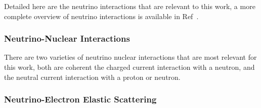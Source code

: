 Detailed here are the neutrino interactions that are relevant to this work, a more
complete overview of neutrino interactions is available in Ref~\cite{XXX}.
\subsubsection{Neutrino-Nuclear Interactions}
There are two varieties of neutrino nuclear interactions that are most
relevant for this work,
both are coherent
the charged current interaction with a neutron, and the
neutral current interaction with a proton or neutron.
\begin{figure}
        \centering
        \begin{feynman}
        \end{feynman}
\end{figure}
\subsubsection{Neutrino-Electron Elastic Scattering}
\begin{figure}
    \begin{subfigure}[t]{0.53\textwidth}
        \centering
        \begin{feynman}
        \end{feynman}
    \end{subfigure}
    \begin{subfigure}[t]{0.53\textwidth}
        \centering
        \begin{feynman}
        \end{feynman}
    \end{subfigure}
    \label{fig:feynman_es}
\end{figure}

